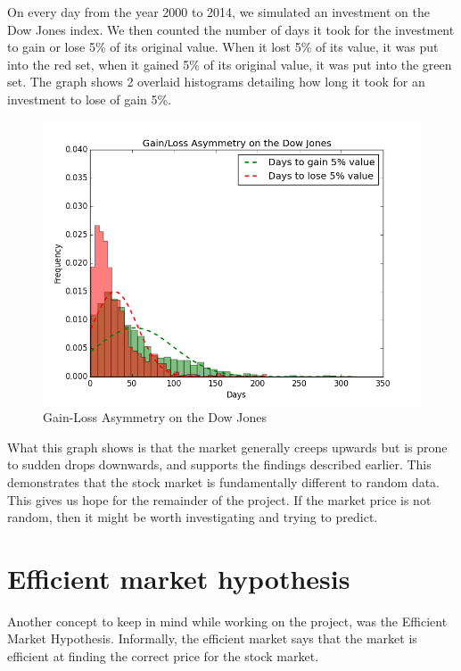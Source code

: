 \documentclass{report}
\begin{document}
On every day from the year 2000 to 2014, we simulated an investment on the Dow Jones index. We then counted the number of days it took for the investment to gain or lose 5\% of its original value. When it lost 5\% of its value, it was put into the red set, when it gained 5\% of its original value, it was put into the green set. The graph shows 2 overlaid histograms detailing how long it took for an investment to lose of gain 5\%.

\begin{figure}[H]
	\caption{Gain-Loss Asymmetry on the Dow Jones}
	\centerline{\includegraphics[width=\textwidth]{vis/gain_loss_asymmetry.png}}
	\label{fig:gain-loss-asymm}
\end{figure}

What this graph shows is that the market generally creeps upwards but is prone to sudden drops downwards, and supports the findings described earlier. This demonstrates that the stock market is fundamentally different to random data. This gives us hope for the remainder of the project. If the market price is not random, then it might be worth investigating and trying to predict.

\section{Efficient market hypothesis}

Another concept to keep in mind while working on the project, was the Efficient Market Hypothesis. Informally, the efficient market says that the market is efficient at finding the correct price for the stock market.
\end{document}
